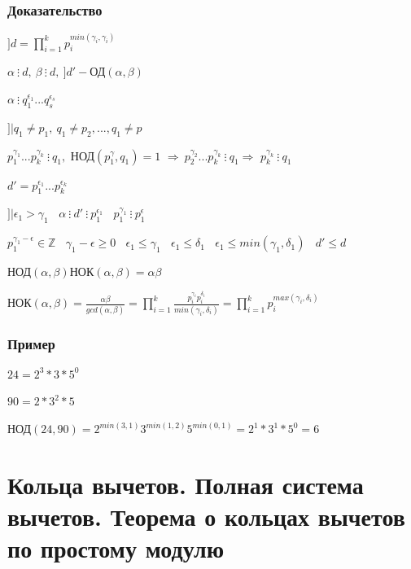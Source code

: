 \documentclass[12pt]{article}
\begin{document}
\subsubsection{Доказательство}
$] d = \prod_{i=1}^k p_i^{min(\gamma_i, \gamma_i)}$ \par
$\alpha \ \vdots \ d, \  \beta \ \vdots \ d, \ ]d'-$ОД$(\alpha, \beta)$ \par
$\alpha \ \vdots \ q_1^{\epsilon_1}...q_s^{\epsilon_s}$ \par
$]| q_1 \not= p_1, \ q_1\not= p_2,...,q_1\not=p$ \par
$p_1^{\gamma_1}...p_k^{\gamma_k} \ \vdots \ q_1,$ НОД$(p_1^\gamma, q_1) = 1$
$\Rightarrow \ p_2^{\gamma_2}...p_k^{\gamma_k} \ \vdots \ q_1 \Rightarrow$
$p_k^{\gamma_k}\ \vdots \ q_1$ \par
$d' = p_1^{\epsilon_1}...p_k^{\epsilon_k}$ \par
$]| \epsilon_1>\gamma_1 \ \ \ \ \alpha \ \vdots \ d' \ \vdots \ p_1^{\epsilon_1} \ \ \ \ p_1^{\gamma_1} \ \vdots \ p_1^\epsilon$ \par
$p_1^{\gamma_1 - \epsilon} \in \mathbb{Z} \ \ \ \ \gamma_1-\epsilon \geq 0 \ \ \ \ \epsilon_1 \leq \gamma_1 \ \ \ \ \epsilon_1 \leq \delta_1 \ \ \ \ \epsilon_1 \leq min(\gamma_1, \delta_1) \ \ \ \ d' \leq d$ \par
НОД$(\alpha, \beta)$НОК$(\alpha, \beta) = \alpha\beta$ \par
НОК$(\alpha, \beta) = \frac{\alpha\beta}{gcd(\alpha, \beta)}=\prod_{i=1}^k \frac{p_i^{\gamma_i}p_i^{\delta_i}}{min(\gamma_i, \delta_i)}=\prod_{i = 1}^kp_i^{max(\gamma_i, \delta_i)}$
\subsubsection{Пример}
$24 = 2^3*3*5^0$ \par $90 = 2 * 3^2 *5$ \par
НОД$(24, 90) = 2^{min(3, 1)}3 ^{min(1, 2)}5^{min(0, 1)} = 2^1*3^1*5^0=6$

\section{Кольца вычетов. Полная система вычетов. Теорема о кольцах вычетов по простому модулю}
\end{document}
